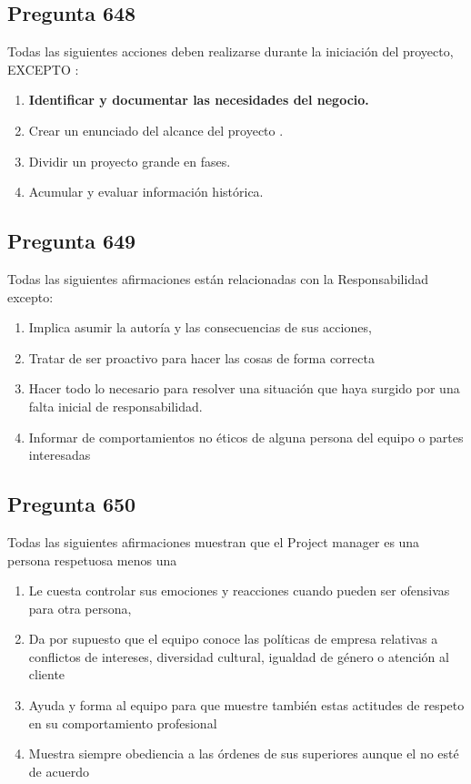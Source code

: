 \documentclass[11pt,a4paper]{article}
\begin{document}
\subsection*{Pregunta 648}
Todas las siguientes acciones deben realizarse durante la iniciación del proyecto, EXCEPTO :

\begin{enumerate}[label=\alph*)]
  \item \textbf{Identificar y documentar las necesidades del negocio.}
  \item Crear un enunciado del alcance del proyecto .
  \item Dividir un proyecto grande en fases.
  \item Acumular y evaluar información histórica.
\end{enumerate}

\subsection*{Pregunta 649}
Todas las siguientes afirmaciones están relacionadas con la Responsabilidad excepto:

\begin{enumerate}[label=\alph*)]
  \item Implica asumir la autoría y las consecuencias de sus acciones,
  \item Tratar de ser proactivo para hacer las cosas de forma correcta
  \item Hacer todo lo necesario para resolver una situación que haya surgido por una falta inicial de responsabilidad.
  \item Informar de comportamientos no éticos de alguna persona del equipo o partes interesadas
\end{enumerate}

\subsection*{Pregunta 650}
Todas las siguientes afirmaciones muestran que el Project manager es una persona respetuosa menos una

\begin{enumerate}[label=\alph*)]
  \item Le cuesta controlar sus emociones y reacciones cuando pueden ser ofensivas para otra persona,
  \item Da por supuesto que el equipo conoce las políticas de empresa relativas a conflictos de intereses, diversidad cultural, igualdad de género o atención al cliente
  \item Ayuda y forma al equipo para que muestre también estas actitudes de respeto en su comportamiento profesional
  \item Muestra siempre obediencia a las órdenes de sus superiores aunque el no esté de acuerdo
\end{enumerate}
\end{document}

